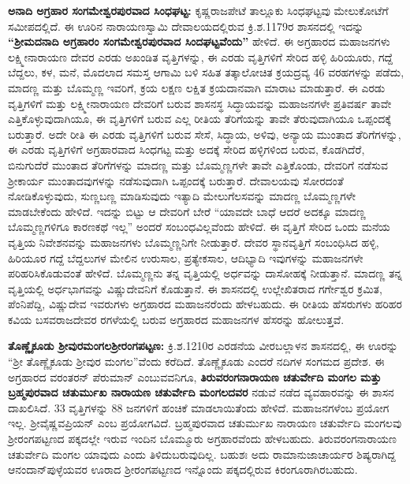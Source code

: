 \textbf{ಅನಾದಿ ಅಗ್ರಹಾರ ಸಂಗಮೇಶ್ವರಪುರವಾದ ಸಿಂಧಘಟ್ಟ:} ಕೃಷ್ಣರಾಜಪೇಟೆ ತಾಲ್ಲೂಕು ಸಿಂಧಘಟ್ಟವು ಮೇಲುಕೋಟೆಗೆ ಸಮೀಪದಲ್ಲಿದೆ. ಈ ಊರಿನ ನಾರಾಯಣಸ್ವಾಮಿ ದೇವಾಲಯದಲ್ಲಿರುವ ಕ್ರಿ.ಶ.1179ರ ಶಾಸನದಲ್ಲಿ ಇದನ್ನು \textbf{“ಶ‍್ರೀಮದನಾದಿ ಅಗ್ರಹಾರಂ ಸಂಗಮೇಶ್ವರಪುರವಾದ ಸಿಂದಘಟ್ಟವೆಂದು”} ಹೇಳಿದೆ. ಈ ಅಗ್ರಹಾರದ ಮಹಾಜನಗಳು ಲಕ್ಷ್ಮೀನಾರಾಯಣ ದೇವರ ಎರಡು ಅಖಂಡಿತ ವೃತ್ತಿಗಳನ್ನು, ಈ ಎರಡು ವೃತ್ತಿಗಳಿಗೆ ಸೇರಿದ ಹಳ್ಳಿ ಹಿರಿಯೂರು, ಗದ್ದೆ ಬೆದ್ದಲು, ಕಳ, ಮನೆ, ಮೊದಲಾದ ಸಮಸ್ತ ಆಗಾಮಿ ಬಳಿ ಸಹಿತ ತತ್ಕಾಲೋಚಿತ ಕ್ರಯದ್ರವ್ಯ 46 ವರಹಗಳನ್ನು ಪಡೆದು, ಮಾದಣ್ಣ ಮತ್ತು ಬೊಮ್ಮಣ್ಣ ಇವರಿಗೆ, ಕ್ರಯ ಲಕ್ಷಣ ಲಕ್ಷಿತ ಕ್ರಯದಾನವಾಗಿ ಮಾರಾಟ ಮಾಡುತ್ತಾರೆ. ಈ ಎರಡು ವೃತ್ತಿಗಳಿಗೆ ಮತ್ತು ಲಕ್ಷ್ಮೀನಾರಾಯಣ ದೇವರಿಗೆ ಬರುವ ಶಾಸನಸ್ಥ ಸಿದ್ಧಾಯವನ್ನು ಮಹಾಜನಗಳೇ ಪ್ರತಿವರ್ಷ ತಾವೇ ಎತ್ತಿಕೊಳ್ಳುವುದಾಗಿಯೂ, ಈ ವೃತ್ತಿಗಳಿಗೆ ಬರುವ ಎಲ್ಲ ರೀತಿಯ ತೆರಿಗೆಯನ್ನು ತಾವೇ ತೆರುವುದಾಗಿಯೂ ಒಪ್ಪಂದಕ್ಕೆ ಬರುತ್ತಾರೆ. ಅದೇ ರೀತಿ ಈ ಎರಡು ವೃತ್ತಿಗಳಿಗೆ ಬರುವ ಸೇಸೆ, ಸಿದ್ಧಾಯ, ಅಳಿವು, ಅನ್ಯಾಯ ಮುಂತಾದ ತೆರಿಗೆಗಳನ್ನು, ಈ ಎರಡು ವೃತ್ತಿಗಳಿಗೆ ಅಗ್ರಹಾರವಾದ ಸಿಂಧಗಟ್ಟ ಮತ್ತು ಅದಕ್ಕೆ ಸೇರಿದ ಹಳ್ಳಿಗಳಿಂದ ಬರುವ, ಕೊಡಗಿದೆರೆ, ಬಿನುಗುದೆರೆ ಮುಂತಾದ ತೆರಿಗೆಗಳನ್ನು ಮಾದಣ್ಣ ಮತ್ತು ಬೊಮ್ಮಣ್ಣಗಳೇ ತಾವೇ ಎತ್ತಿಕೊಂಡು, ದೇವರಿಗೆ ನಡೆಸುವ ಶ‍್ರೀಕಾರ್ಯ ಮುಂತಾದವುಗಳನ್ನು ನಡೆಸುವುದಾಗಿ ಒಪ್ಪಂದಕ್ಕೆ ಬರುತ್ತಾರೆ. ದೇವಾಲಯವು ಸೋರದಂತೆ ನೋಡಿಕೊಳ್ಳುವುದು, ಸುಣ್ಣಬಣ್ಣ ಮಾಡಿಸುವುದು ಇತ್ಯಾದಿ ಮೇಲುಗೆಲಸವನ್ನು ಮಾದಣ್ಣ ಬೊಮ್ಮಣ್ಣಗಳೇ ಮಾಡಬೇಕೆಂದು ಹೇಳಿದೆ. ಇದನ್ನು ಬಿಟ್ಟು ಆ ದೇವರಿಗೆ ಬೇರೆ “ಯಾವದೇ ಬಾಧೆ ಆದರೆ ಅದಕ್ಕೂ ಮಾದಣ್ಣ ಬೊಮ್ಮಣ್ಣಗಳಿಗೂ ಕಾರಣಕಥೆ ಇಲ್ಲ” ಅಂದರೆ ಸಂಬಂಧವಿಲ್ಲವೆಂದು ಹೇಳಿದೆ. ಈ ವೃತ್ತಿಗೆ ಸೇರಿದ ಒಂದು ಮನೆಯ ವೃತ್ತಿಯ ನಿವೇಶನವನ್ನು ಮಹಾಜನಗಳು ಬೊಮ್ಮಣ್ಣನಿಗೇ ನೀಡುತ್ತಾರೆ. ದೇವರ ಸ್ಥಾನವೃತ್ತಿಗೆ ಸಂಬಂಧಿಸಿದ ಹಳ್ಳಿ, ಹಿರಿಯೂರ ಗದ್ದೆ ಬೆದ್ದಲುಗಳ ಮೇಲಿನ ಉರುಸಾಲ, ಪ್ರತ್ಯೇಕಸಾಲ, ಆದಿಭ್ಯಾದಿ ಇವುಗಳನ್ನು ಮಹಾಜನಗಳೇ ಪರಿಹರಿಸಿಕೊಡುವಂತೆ ಹೇಳಿದೆ. ಬೊಮ್ಮಣ್ಣನು ತನ್ನ ವೃತ್ತಿಯಲ್ಲಿ ಅರ್ಧವನ್ನು ದಾಸೋಹಕ್ಕೆ ನೀಡುತ್ತಾನೆ. ಮಾದಣ್ಣ ತನ್ನ ವೃತ್ತಿಯಲ್ಲಿ ಅರ್ಧಭಾಗವನ್ನು ವಿಷ್ಣುದೇವನಿಗೆ ಕೊಡುತ್ತಾನೆ. ಈ ಶಾಸನದಲ್ಲಿ ಉಲ್ಲೇಖಿತರಾದ ಗರ್ಗೇಶ್ವರ ಕ್ರಮಿತ, ಪೆಂನಿಪೆದ್ದಿ, ವಿಷ್ಣುದೇವ ಇವರುಗಳು ಅಗ್ರಹಾರದ ಮಹಾಜನರೆಂದು ಹೇಳಬಹುದು. ಈ ರೀತಿಯ ಹೆಸರುಗಳು ಹರಿಹರ ಕವಿಯ ಬಸವರಾಜದೇವರ ರಗಳೆಯಲ್ಲಿ ಬರುವ ಅಗ್ರಹಾರದ ಮಹಾಜನಗಳ ಹೆಸರನ್ನು ಹೋಲುತ್ತವೆ.

\textbf{ತೊಣ್ಣೈಕೂಡು ಶ‍್ರೀವುರಮಂಗಲ\general{\enginline{-}}ಶ‍್ರೀರಂಗಪಟ್ಟಣ:} ಕ್ರಿ.ಶ.1210ರ ಎರಡನೆಯ ವೀರಬಲ್ಲಾಳನ ಶಾಸನದಲ್ಲಿ, ಈ ಊರನ್ನು “ಶ‍್ರೀ ತೊಣ್ಣೈಕೂಡು ಶ‍್ರೀವುರ ಮಂಗಲ”ವೆಂದು ಕರೆದಿದೆ. ತೊಣ್ಣೈಕೂಡು ಎಂದರೆ ನದಿಗಳ ಸಂಗಮದ ಪ್ರದೇಶ. ಈ ಅಗ್ರಹಾರದ ವರಂತರನ್​ ಪೆರುಮಾನ್​ ಎಂಬುವವನಿಗೂ, \textbf{ತಿರುವರಂಗನಾರಾಯಣ ಚತುರ್ವೇದಿ ಮಂಗಲ ಮತ್ತು ಬ್ರಹ್ಮಪುರವಾದ ಚತುರ್ಮುಖ ನಾರಾಯಣ ಚತುರ್ವೇದಿ ಮಂಗಲದವರ} ನಡುವೆ ನಡೆದ ವ್ಯವಹಾರವನ್ನು ಈ ಶಾಸನ ದಾಖಲಿಸಿದೆ. 33 ವೃತ್ತಿಗಳನ್ನು 88 ಜನಗಳಿಗೆ ಹಂಚಿಕೆ ಮಾಡಲಾಯಿತೆಂದು ಹೇಳಿದೆ. ಮಹಾಜನಗಳೆಂಬ ಪ್ರಯೋಗ ಇಲ್ಲ. ಶ‍್ರೀವೈಷ್ಣವಪ್ರಿಯನ್​ ಎಂಬ ಪ್ರಯೋಗವಿದೆ. ಬ್ರಹ್ಮಪುರವಾದ ಚತುರ್ಮುಖ ನಾರಾಯಣ ಚತುರ್ವೇದಿ ಮಂಗಲವು ಶ‍್ರೀರಂಗಪಟ್ಟಣದ ಪಕ್ಕದಲ್ಲೇ ಇರುವ ಇಂದಿನ ಬೊಮ್ಮೂರು ಅಗ್ರಹಾರವೆಂದು ಹೇಳಬಹುದು. ತಿರುವರಂಗನಾರಾಯಣ ಚತುರ್ವೇದಿ ಮಂಗಲ ಯಾವುದು ಎಂದು ತಿಳಿದುಬರುವುದಿಲ್ಲ. ಬಹುಶಃ ಅದು ರಾಮಾನುಜಾಚಾರ್ಯರ ಶಿಷ್ಯರಾಗಿದ್ದ ಆನಂದಾನ್​ಪುಳ್ಳೆಯವರ ಊರಾದ ಶ‍್ರೀರಂಗಪಟ್ಟಣದ ಇನ್ನೊಂದು ಪಕ್ಕದಲ್ಲಿರುವ ಕಿರಂಗೂರಾಗಿರಬಹುದು.

